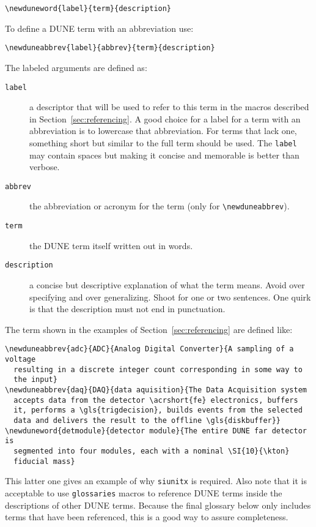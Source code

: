 \documentclass{article}
\begin{document}
\begin{verbatim}
\newduneword{label}{term}{description}
\end{verbatim}

\noindent To define a DUNE term with an abbreviation use:

\begin{verbatim}
\newduneabbrev{label}{abbrev}{term}{description}
\end{verbatim}

\noindent The labeled arguments are defined as:

\begin{description}
\item[\texttt{label}] a descriptor that will be used to refer to this
  term in the macros described in Section~\ref{sec:referencing}. 
  A good choice for a label for a term with an abbreviation is to
  lowercase that abbreviation. 
  For terms that lack one, something short but similar to the full
  term should be used. 
  The \texttt{label} may contain spaces but making it concise and
  memorable is better than verbose.
\item[\texttt{abbrev}] the abbreviation or acronym for the term (only for \verb|\newduneabbrev|).
\item[\texttt{term}] the DUNE term itself written out in words.
\item[\texttt{description}] a concise but descriptive explanation of
  what the term means. 
  Avoid over specifying and over generalizing. 
  Shoot for one or two sentences. 
  One quirk is that the description must not end in punctuation. 
\end{description}

The term shown in the examples of Section~\ref{sec:referencing} are
defined like:

\begin{verbatim}
\newduneabbrev{adc}{ADC}{Analog Digital Converter}{A sampling of a voltage
  resulting in a discrete integer count corresponding in some way to
  the input}
\newduneabbrev{daq}{DAQ}{data aquisition}{The Data Acquisition system
  accepts data from the detector \acrshort{fe} electronics, buffers
  it, performs a \gls{trigdecision}, builds events from the selected
  data and delivers the result to the offline \gls{diskbuffer}}
\newduneword{detmodule}{detector module}{The entire DUNE far detector is
  segmented into four modules, each with a nominal \SI{10}{\kton}
  fiducial mass}
\end{verbatim}

This latter one gives an example of why \texttt{siunitx} is required. 
Also note that it is acceptable to use \texttt{glossaries} macros to
reference DUNE terms inside the descriptions of other DUNE terms. 
Because the final glossary below only includes terms that have been
referenced, this is a good way to assure completeness.
 



\cleardoublepage
\printglossaries
\end{document}
